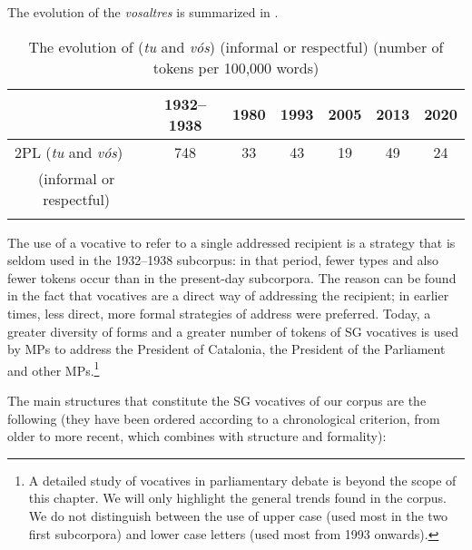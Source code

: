 \documentclass[output=paper]{langscibook}
\begin{document}
The evolution of the  \textit{vosaltres} is summarized in .


\begin{table}
\begin{tabular}{ccccccc} 
\lsptoprule
& {1932–1938} & {1980} & {1993} & {2005} & {2013} & {{2020}}\\
\midrule

\multicolumn{1}{l}{{{2PL} {(\textit{tu}} {and} {\textit{vós}})}} & {748} & {33} & {43} & {19} & {49} & {24}\\
{{(informal} {or} {respectful)}}\\
\lspbottomrule
\end{tabular}
\caption{The evolution of  (\textit{tu} and \textit{vós}) (informal or respectful) (number of tokens per 100,000 words)}
\label{tab:nogue:11}
\end{table}


\label{sec:nogue:2.2.1.6}






The use of a vocative to refer to a single addressed recipient is a strategy that is seldom used in the 1932–1938 subcorpus: in that period, fewer types and also fewer tokens occur than in the present-day subcorpora. The reason can be found in the fact that vocatives are a direct way of addressing the recipient; in earlier times, less direct, more formal strategies of address were preferred. Today, a greater diversity of forms and a greater number of tokens of SG vocatives is used by MPs to address the President of Catalonia, the President of the Parliament and other MPs.\footnote{A detailed study of vocatives in parliamentary debate is beyond the scope of this chapter. We will only highlight the general trends found in the corpus. We do not distinguish between the use of upper case (used most in the two first subcorpora) and lower case letters (used most from 1993 onwards).}



The main structures that constitute the SG vocatives of our corpus are the following (they have been ordered according to a chronological criterion, from older to more recent, which combines with structure and formality):
\end{document}

